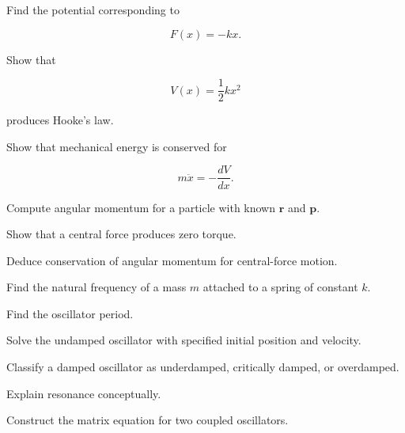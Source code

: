 \begin{exercise}[2]
Find the potential corresponding to

\[
F(x)=-kx.
\]
\end{exercise}

\begin{exercise}[2]
Show that

\[
V(x)=\frac12kx^2
\]

produces Hooke's law.
\end{exercise}

\begin{exercise}[3]
Show that mechanical energy is conserved for

\[
m\ddot{x}
=
-\frac{dV}{dx}.
\]
\end{exercise}

\begin{exercise}[2]
Compute angular momentum for a particle with known
\(\mathbf{r}\) and \(\mathbf{p}\).
\end{exercise}

\begin{exercise}[3]
Show that a central force produces zero torque.
\end{exercise}

\begin{exercise}[3]
Deduce conservation of angular momentum for central-force motion.
\end{exercise}

\begin{exercise}[2]
Find the natural frequency of a mass \(m\) attached to a spring of constant
\(k\).
\end{exercise}

\begin{exercise}[2]
Find the oscillator period.
\end{exercise}

\begin{exercise}[3]
Solve the undamped oscillator with specified initial position and velocity.
\end{exercise}

\begin{exercise}[3]
Classify a damped oscillator as underdamped, critically damped, or
overdamped.
\end{exercise}

\begin{exercise}[3]
Explain resonance conceptually.
\end{exercise}

\begin{exercise}[3]
Construct the matrix equation for two coupled oscillators.
\end{exercise}

